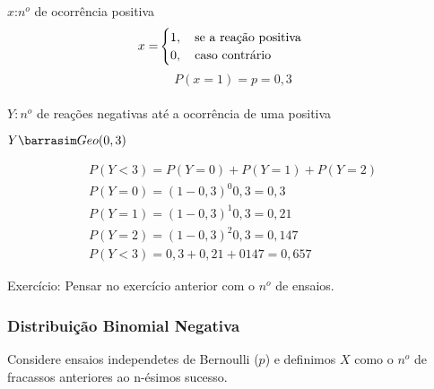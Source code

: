 \documentclass[11pt,a4paper]{article}
\begin{document}
$x$:$n^o$ de ocorrência positiva 
\begin{align*}
  x=&\begin{cases}
    1, \text{\quad se a reação positiva}\\
    0, \text{\quad caso contrário}
  \end{cases}
\end{align*}
$$P(x=1)=p=0,3$$\\
$Y: n^o$ de reações negativas até a ocorrência de uma positiva\\
\begin{center}$Y \barrasim Geo(0,3)$\end{center}
\begin{align*}
  P(Y<3)=P(Y=0)+P(Y=1)+P(Y=2)\\
  P(Y=0)=(1-0,3)^0 0,3 = 0,3\\
  P(Y=1)=(1-0,3)^1 0,3 = 0,21\\
  P(Y=2)=(1-0,3)^2 0,3 = 0,147\\
  P(Y<3)=0,3+0,21+0147=0,657
\end{align*}

Exercício: Pensar no exercício anterior com o $n^o$ de ensaios.

\subsubsection{Distribuição Binomial Negativa}
Considere ensaios independetes de Bernoulli ($p$) e definimos $X$ como o $n^o$ 
de fracassos anteriores ao n-ésimos sucesso.
\end{document}
